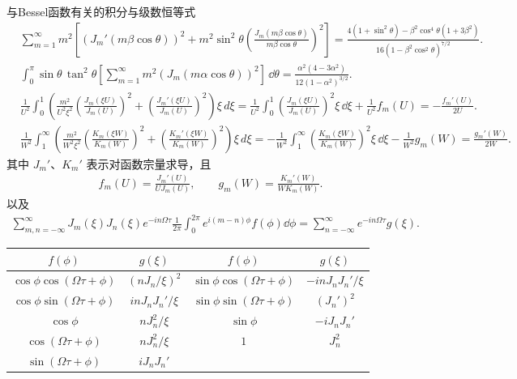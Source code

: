 与Bessel函数有关的积分与级数恒等式
\begin{align*}
	&\sum_{m=1}^{\infty} m^{2} \left[ \left( J_{m}'(m \beta \cos\theta) \right)^{2} + m^{2} \sin^{2}\theta \left( \frac{J_{m}(m \beta \cos\theta)}{m \beta \cos\theta} \right)^{2} \right] =  \frac{4(1 + \sin^{2}\theta) - \beta^{2} \cos^{4}\theta (1 + 3\beta^{2})}{16 (1 - \beta^{2} \cos^{2}\theta)^{7/2}}. \\
	&\int_{0}^{\pi} \sin\theta \, \tan^{2}\theta \left[ \sum_{m=1}^{\infty} m^{2} \left( J_{m}(m \alpha \cos\theta) \right)^{2} \right] \, \dd \theta = \frac{\alpha^{2} (4 - 3\alpha^{2})}{12 (1 - \alpha^{2})^{3/2}}. \\
	&\frac{1}{U^2} \int_0^1 \left( \frac{m^2}{U^2 \xi^2} \left( \frac{J_m(\xi U)}{J_m(U)} \right)^2 + \left( \frac{J_m'(\xi U)}{J_m(U)} \right)^2 \right) \xi \, d\xi = \frac{1}{U^2} \int_0^1 \left( \frac{J_m(\xi U)}{J_m(U)} \right)^2 \xi \, \dd \xi + \frac{1}{U^2} f_m(U) = - \frac{f_m'(U)}{2U}.\\
	&\frac{1}{W^2} \int_1^\infty \left( \frac{m^2}{W^2 \xi^2} \left( \frac{K_m(\xi W)}{K_m(W)} \right)^2 + \left( \frac{K_m'(\xi W)}{K_m(W)} \right)^2 \right) \xi \, d\xi = -\frac{1}{W^2} \int_1^\infty \left( \frac{K_m(\xi W)}{K_m(W)} \right)^2 \xi \, \dd \xi - \frac{1}{W^2} g_m(W) = \frac{g_m'(W)}{2W}.
\end{align*}
其中 \(J_m'\)、\(K_m'\) 表示对函数宗量求导，且
\begin{align*}
	f_m(U)=\frac{J_m'(U)}{U J_m(U)},\qquad g_m(W)=\frac{K_m'(W)}{W K_m(W)}.
\end{align*}
以及
\begin{align*}
	\sum_{m,n=-\infty}^{\infty} J_{m}(\xi) J_{n}(\xi) e^{-i n \Omega \tau} \frac{1}{2 \pi} \int_{0}^{2 \pi} e^{i(m-n) \phi} f(\phi) \dd  \phi = \sum_{n=-\infty}^{\infty} e^{-i n \Omega \tau} g(\xi).
\end{align*}
\begin{table}[htbp]
	\centering
	\begin{tabular}{|c|c|c|c|}
		\toprule
		\(f(\phi)\)                       & \(g(\xi)\)                    & \(f(\phi)\)                       & \(g(\xi)\)                \\
		\midrule
		\(\cos\phi\cos(\Omega\tau+\phi)\) & \(\left( nJ_n/\xi \right)^2\) & \(\sin\phi\cos(\Omega\tau+\phi)\) & \(-inJ_nJ_n'/\xi\)        \\
		\(\cos\phi\sin(\Omega\tau+\phi)\) & \(inJ_nJ_n'/\xi\)             & \(\sin\phi\sin(\Omega\tau+\phi)\) & \(\left( J_n' \right)^2\) \\
		\(\cos\phi\)                      & \(nJ_n^2/\xi\)                & \(\sin\phi\)                      & \(-iJ_nJ_n'\)             \\
		\(\cos(\Omega\tau+\phi)\)         & \(nJ_n^2/\xi\)                & \(1\)                             & \(J_n^2\)                 \\
		\(\sin(\Omega\tau+\phi)\)         & \(iJ_nJ_n'\)                  &                                   &                           \\
		\bottomrule
	\end{tabular}
\end{table}

